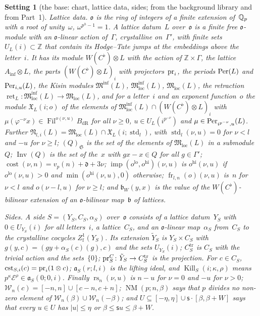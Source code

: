 \documentclass[11pt,a4paper]{article}
\newcommand{\m}[1]{\mbox{$#1$}}        %
\theoremstyle{plainx}
\theoremstyle{uprightx}
\newtheorem{setting}[theorem]{Setting}          %
\providecommand{\Ainf}{A_{\inf}}\providecommand{\WC}{W(C^{\flat})}\providecommand{\BdR}{B_{\mathrm{dR}}}
\providecommand{\Fil}{\operatorname{Fil}}\providecommand{\fS}{\mathfrak{S}}\providecommand{\cE}{\mathcal{E}}
\providecommand{\fo}{\mathfrak{o}}\providecommand{\fc}{\mathfrak{c}}\providecommand{\fd}{\mathfrak{d}}
\providecommand{\Minf}{\mathfrak{M}^{\inf}}\providecommand{\Mloc}{\mathfrak{M}_{\mathrm{loc}}}
\providecommand{\Mlocinf}{\mathfrak{M}^{\inf}_{\mathrm{loc}}}\providecommand{\std}{\operatorname{std}}
\providecommand{\ret}{\operatorname{ret}}
\providecommand{\cost}[2]{\operatorname{cost}(#1,#2)}
\providecommand{\wExp}[3]{\mathfrak{X}_{#1}(#2;#3)}
\providecommand{\locLP}[2]{\mathfrak{N}_{#1,#2}}
\providecommand{\locKP}[1]{(#1)_{\fS}}
\providecommand{\invMod}[1]{\operatorname{Inv}(#1)}
\providecommand{\impE}[4]{\operatorname{imp}(#1,#2)(#3,#4)}
\providecommand{\wPair}[3]{{#1}_{W}(#2,#3)}
\providecommand{\frobX}[5]{\operatorname{fr}_{#1,#2}(#3)(#4,#5)}
\providecommand{\extL}[1]{\tilde{Y}_{#1}}
\providecommand{\trivL}[1]{C^{\mathrm{tr}}_{#1}}
\providecommand{\projC}[1]{\pr^{C}_{#1}}
\providecommand{\JumpWin}[5]{#5\subseteq[-#1,#1]\cup#2\cdot[#3,#3+#4]}
\providecommand{\raisedE}[3]{\operatorname{rs}_{#1}(#2,#3)}
\providecommand{\twoWin}[2]{\mathcal{W}_{#1}(#2)}
\providecommand{\NoMult}[3]{\operatorname{NM}(#1;#2,#3)}
\providecommand{\constAt}[3]{\operatorname{cst}_{#1,#2}(#3)}
\providecommand{\liftId}[4]{\mathfrak{a}_{#1}(#2;#3,#4)}
\providecommand{\Kills}[4]{\operatorname{Kill}_{#1}(#2;#3,#4)}
\begin{document}
\begin{setting}[the base: chart, lattice data, sides; from the background library and from Part~1]
\emph{Lattice data.} $\fo$ is the ring of integers of a finite extension of~$\mathbb{Q}_p$ with a root of
unity~$\omega$, \m{\omega^{p^h-1}=1}. A lattice datum~$L$ over~$\fo$ is a finite free $\fo$-module with an
$\fo$-linear action of~$\Gamma$, crystalline on~$\Gamma'$, with finite sets \m{U_L(i)\subset\mathbb{Z}} that
contain its Hodge--Tate jumps at the embeddings above the letter~$i$. It has its module \m{\WC\otimes L} with
the action of \m{\mathbb{Z}\times\Gamma}, the lattice \m{\Ainf\otimes L}, the parts \m{(\WC\otimes L)_i} with
projectors~$\operatorname{pr}_i$, the periods \m{\Per(L)} and \m{\Per_{i,u}(L)}, the Kisin modules \m{\Minf(L)},
\m{\Mlocinf(L)}, \m{\Mloc(L)}, the retraction $\ret_L\colon\Mlocinf(L)\to\Mloc(L)$, and for a letter~$i$ and
an exponent function~$o$ the module \m{\wExp{L}{i}{o}} of the elements of
$\Mlocinf(L)\cap(\WC\otimes L)_i$ with
$\mu(\varphi^{-\nu}x)\in\Fil^{o(\nu,u)}\BdR$ for all \m{\nu\ge0}, \m{u\in U_L(i^{p^{-\nu}})} and
\m{\mu\in\Per_{i^{p^{-\nu}},u}(L)}. Further $\locLP{l}{i}(L)=\Mloc(L)\cap\wExp{L}{i}{\std_l}$, with
\m{\std_l(\nu,u)=0} for \m{\nu<l} and \m{-u} for \m{\nu\ge l}; \m{\locKP{Q}} is the set of the elements of
\m{\Mloc(L)} in a submodule~$Q$; \m{\invMod{Q}} is the set of the~$x$ with \m{gx-x\in Q} for all
\m{g\in\Gamma'}; \m{\cost{\nu}{n}=v_p(n)+\fd+3\nu}; $\impE{o^{\mathrm{lo}}}{o^{\mathrm{hi}}}{\nu}{u}$ is
\m{o^{\mathrm{hi}}(\nu,u)} if \m{o^{\mathrm{lo}}(\nu,u)>0} and \m{\min(o^{\mathrm{hi}}(\nu,u),0)} otherwise;
\m{\frobX{l}{n}{o}{\nu}{u}} is~$n$ for \m{\nu<l} and \m{o(\nu-l,u)} for \m{\nu\ge l}; and
\m{\wPair{\mathfrak{b}}{y}{x}} is the value of the $\WC$-bilinear extension of an $\fo$-bilinear map~$\mathfrak{b}$ of lattices.

\emph{Sides.} A side \m{S=(Y_S,C_S,\alpha_S)} over~$\fo$ consists of a lattice datum~$Y_S$ with
\m{0\in U_{Y_S}(i)} for all letters~$i$, a lattice~$C_S$, and an $\fo$-linear map~$\alpha_S$ from~$C_S$ to the
crystalline cocycles \m{Z^{1}_{\mathrm{f}}(Y_S)}. Its extension \m{\extL{S}} is \m{Y_S\times C_S} with
\m{g(y,c)=(gy+\alpha_S(c)(g),c)} and the sets \m{U_{Y_S}(i)}; \m{\trivL{S}} is $C_S$ with the trivial action and
the sets~$\{0\}$; $\projC{S}\colon\extL{S}\to\trivL{S}$ is the projection. For \m{c\in C_S},
$\constAt{S}{i}{c}=\pr_i(1\otimes c)$; \m{\liftId{S}{r}{l}{i}} is the lifting ideal, and
\m{\Kills{S}{i}{\kappa}{\rho}} means $p^{\kappa}\cE^{\rho}\in\liftId{S}{0}{0}{i}$. Finally
\m{\raisedE{n}{\nu}{u}} is \m{n-u} for \m{\nu=0} and \m{-u} for \m{\nu>0};
$\twoWin{n}{c}=[-n,n]\cup[c-n,c+n]$; \m{\NoMult{p}{n}{\beta}} says that $p$ divides no non-zero element of
$\twoWin{n}{\beta}\cup\twoWin{n}{-\beta}$; and $\JumpWin{\eta}{\mathsf{s}}{\beta}{W}{U}$ says that every
\m{u\in U} has \m{|u|\le\eta} or \m{\beta\le\mathsf{s} u\le\beta+W}.
\end{setting}
\end{document}
